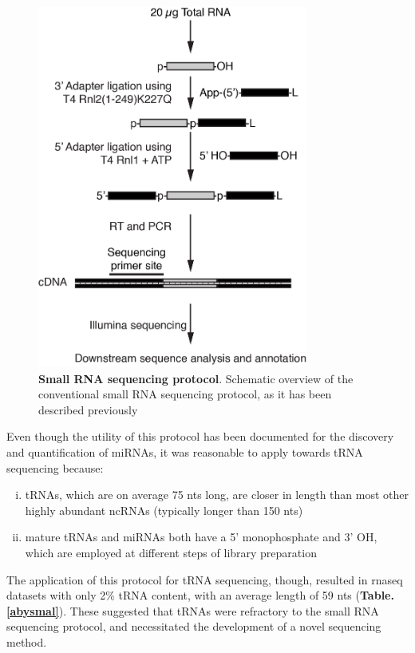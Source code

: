 \documentclass[12pt]{rockefeller}
\begin{document}
\begin{figure}[!ht]%
\centering
\includegraphics[width=3.5in]{sRNA.png}%
\caption[Small RNA sequencing protocol]{\textbf{Small RNA sequencing protocol}. Schematic overview of the conventional small RNA sequencing protocol, as it has been described previously \cite{Hafner:2012eaa}} 
\centering
\label{sRNA}%
\end{figure}

Even though the utility of this protocol has been documented for the discovery and quantification of miRNAs, it was reasonable to apply towards tRNA sequencing because:
\begin{enumerate}[i)]
\item tRNAs, which are on average 75 \glspl{nt} long, are closer in length than most other highly abundant ncRNAs (typically longer than 150 nts) 
\item mature tRNAs and miRNAs both have a 5' monophosphate and 3' OH, which are employed at different steps of library preparation
\end{enumerate}

The application of this protocol for tRNA sequencing, though, resulted in \gls{rnaseq} datasets with only 2\% tRNA content, with an average length of 59 nts (\textbf{Table. \ref{abysmal}}). These suggested that tRNAs were refractory to the small RNA sequencing protocol, and necessitated the development of a novel sequencing method. 
\end{document}
